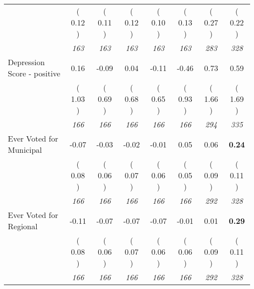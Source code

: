 \begin{tabular}{l c c c c c c c}
& (     0.12 ) & (     0.11 ) & (     0.12 ) & (     0.10 ) & (     0.13 ) & (     0.27 ) & (     0.22 ) \\
& \textit{ 163 } & \textit{ 163 } & \textit{ 163 } & \textit{ 163 } & \textit{ 163 } & \textit{ 283 } & \textit{ 328 } \\
Depression Score - positive &      0.16 &     -0.09 &      0.04 &     -0.11 &     -0.46 &      0.73 &      0.59 \\
& (     1.03 ) & (     0.69 ) & (     0.68 ) & (     0.65 ) & (     0.93 ) & (     1.66 ) & (     1.69 ) \\
& \textit{ 166 } & \textit{ 166 } & \textit{ 166 } & \textit{ 166 } & \textit{ 166 } & \textit{ 294 } & \textit{ 335 } \\
Ever Voted for Municipal &     -0.07 &     -0.03 &     -0.02 &     -0.01 &      0.05 &      0.06 & \textbf{      0.24 } \\
& (     0.08 ) & (     0.06 ) & (     0.07 ) & (     0.06 ) & (     0.05 ) & (     0.09 ) & (     0.11 ) \\
& \textit{ 166 } & \textit{ 166 } & \textit{ 166 } & \textit{ 166 } & \textit{ 166 } & \textit{ 292 } & \textit{ 328 } \\
Ever Voted for Regional &     -0.11 &     -0.07 &     -0.07 &     -0.07 &     -0.01 &      0.01 & \textbf{      0.29 } \\
& (     0.08 ) & (     0.06 ) & (     0.07 ) & (     0.06 ) & (     0.06 ) & (     0.09 ) & (     0.11 ) \\
& \textit{ 166 } & \textit{ 166 } & \textit{ 166 } & \textit{ 166 } & \textit{ 166 } & \textit{ 292 } & \textit{ 328 } \\
\bottomrule
\end{tabular}
